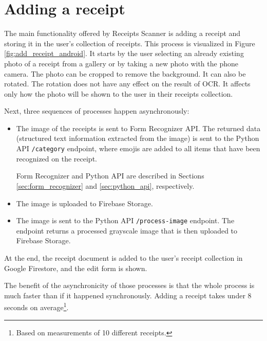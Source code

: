 \documentclass[
  digital, %
  table,   %
  oneside, %
  lof,     %
  lot,     %
]{fithesis3}
\begin{document}
\section{Adding a receipt}
The main functionality offered by Receipts Scanner is adding a receipt and storing it in the user's collection of receipts.
This process is visualized in Figure \ref{fig:add_receipt_android}.
It starts by the user selecting an already existing photo of a receipt from a gallery or by taking a new photo with the phone camera. The photo can be cropped to remove the background. It can also be rotated. The rotation does not have any effect on the result of OCR. It affects only how the photo will be shown to the user in their receipts collection.

Next, three sequences of processes happen asynchronously:

\begin{itemize}
    \item The image of the receipts is sent to Form Recognizer API. The returned data (structured text information extracted from the image) is sent to the Python API \texttt{/category} endpoint, where emojis are added to all items that have been recognized on the receipt.
    
    Form Recognizer and Python API are described in Sections \ref{sec:form_recognizer} and \ref{sec:python_api}, respectively.
    
    \item The image is uploaded to Firebase Storage.

    \item The image is sent to the Python API \texttt{/process-image} endpoint. The endpoint returns a processed grayscale image that is then uploaded to Firebase Storage.
\end{itemize}

At the end, the receipt document is added to the user's receipt collection in Google Firestore, and the edit form is shown. 

The benefit of the asynchronicity of those processes is that the whole process is much faster than if it happened synchronously. Adding a receipt takes under 8 seconds on average\footnote{Based on measurements of 10 different receipts.}.
\end{document}
